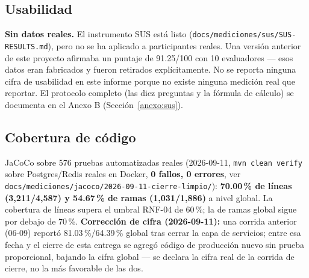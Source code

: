 \subsection{Usabilidad}

\textbf{Sin datos reales.} El instrumento SUS \cite{brooke1996} está listo
(\texttt{docs/mediciones/sus/SUS-RESULTS.md}), pero no se ha aplicado a participantes reales. Una versión
anterior de este proyecto afirmaba un puntaje de 91.25/100 con 10 evaluadores --- esos datos eran
fabricados y fueron retirados explícitamente. No se reporta ninguna cifra de usabilidad en este informe
porque no existe ninguna medición real que reportar. El protocolo completo (las diez preguntas y la
fórmula de cálculo) se documenta en el Anexo B (Sección~\ref{anexo:sus}).

\subsection{Cobertura de código}

JaCoCo sobre 576 pruebas automatizadas reales (2026-09-11, \texttt{mvn clean verify} sobre Postgres/Redis
reales en Docker, \textbf{0 fallos, 0 errores}, ver \texttt{docs/mediciones/jacoco/2026-09-11-cierre-limpio/}):
\textbf{70.00\,\% de líneas (3,211/4,587) y 54.67\,\% de ramas (1,031/1,886)} a nivel global. La
cobertura de líneas supera el umbral RNF-04 de 60\,\%; la de ramas global sigue por debajo de 70\,\%.
\textbf{Corrección de cifra (2026-09-11):} una corrida anterior (06-09) reportó 81.03\,\%/64.39\,\%
global tras cerrar la capa de servicios; entre esa fecha y el cierre de esta entrega se agregó código de
producción nuevo sin prueba proporcional, bajando la cifra global --- se declara la cifra real de la
corrida de cierre, no la más favorable de las dos.


